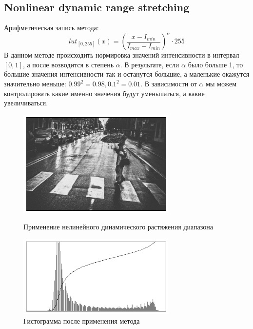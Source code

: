 \documentclass[a4paper,12pt]{article}
\begin{document}
\subsection{Nonlinear dynamic range stretching}
Арифметическая запись метода:
$$lut_{[0,255]}(x) = \left( \dfrac{x - I_{min}}{I_{max} - I_{min}} \right) ^ \alpha \cdot 255$$
В данном методе происходить нормировка значений интенсивности в интервал $[0,1]$, а после возводится в степень $\alpha$. В результате, если $\alpha$ было больше 1, то большие значения интенсивности так и останутся большие, а маленькие окажутся значительно меньше: $0.99^2 = 0.98,  0.1^2 = 0.01$. В зависимости от $\alpha$ мы можем контролировать какие именно значения будут уменьшаться, а какие увеличиваться.
\begin{figure}[H]
    \centering \includegraphics[width=0.7\textwidth]{images/nonlin.png}
    \caption{Применение нелинейного динамического растяжения диапазона}
    \centering \includegraphics[width=0.7\textwidth]{images/nonlin_hist.png}
    \caption{Гистограмма после применения метода}
\end{figure}
\end{document}
